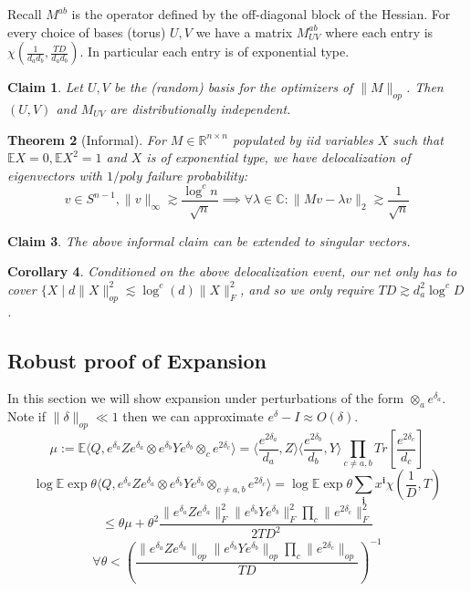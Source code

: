 \documentclass{article}
\newtheorem{theorem}{Theorem}
\newtheorem{corollary}[theorem]{Corollary}
\newtheorem{claim}[theorem]{Claim}
\newcommand{\R}{{\mathbb{R}}}
\newcommand{\C}{{\mathbb{C}}}
\renewcommand{\vec}{\bm}
\newcommand{\E}{\mathbb{E}}
\begin{document}
Recall $M^{ab}$ is the operator defined by the off-diagonal block of the Hessian. For every choice of bases (torus) $U,V$ we have a matrix $M^{ab}_{UV}$ where each entry is $\chi(\frac{1}{d_{a}d_{b}}, \frac{TD}{d_{a}d_{b}})$. In particular each entry is of exponential type.

\begin{claim}
Let $U,V$ be the (random) basis for the optimizers of $\|M\|_{op}$. Then $(U,V)$ and $M_{UV}$ are distributionally independent.
\end{claim}

\begin{theorem} [Informal]
For $M \in \R^{n \times n}$ populated by iid variables $X$ such that $\E X = 0, \E X^{2} = 1$ and $X$ is of exponential type, we have delocalization of eigenvectors with $1/poly$ failure probability:
\[ v \in S^{n-1}, \|v\|_{\infty} \gtrsim \frac{\log^{c} n}{\sqrt{n}} \implies \forall \lambda \in \C: \|Mv - \lambda v\|_{2} \gtrsim \frac{1}{\sqrt{n}}   \]
\end{theorem}


\begin{claim}
The above informal claim can be extended to singular vectors.
\end{claim}

\begin{corollary}
Conditioned on the above delocalization event, our net only has to cover $\{X \mid d \|X\|_{op}^{2} \lesssim \log^{c}(d) \|X\|_{F}^{2}$, and so we only require $TD \gtrsim d_{a}^{2} \log^{c} D$.
\end{corollary}


\subsection{Robust proof of Expansion}
In this section we will show expansion under perturbations of the form $\otimes_{a} e^{\delta_{a}}$. Note if $\|\delta\|_{op} \ll 1$ then we can approximate $e^{\delta} - I \approx O(\delta)$.
\[ \mu := \E \langle Q, e^{\delta_{a}} Z e^{\delta_{a}} \otimes e^{\delta_{b}} Y e^{\delta_{b}} \otimes_{c} e^{2\delta_{c}} \rangle = \langle \frac{e^{2\delta_{a}}}{d_{a}} , Z \rangle \langle \frac{e^{2\delta_{b}}}{d_{b}}, Y \rangle \prod_{c \neq a,b} Tr[\frac{e^{2\delta_{c}}}{d_{c}} ]  \]
\[ \log \E \exp \theta \langle Q, e^{\delta_{a}} Z e^{\delta_{a}} \otimes e^{\delta_{b}} Y e^{\delta_{b}} \otimes_{c \neq a,b} e^{2\delta_{c}} \rangle = \log \E \exp \theta \sum_{\vec{i}} x^{\vec{i}} \chi(\frac{1}{D},T)   \]
\[ \leq \theta \mu + \theta^{2} \frac{\|e^{\delta_{a}} Z e^{\delta_{a}}\|_{F}^{2} \|e^{\delta_{b}} Y e^{\delta_{b}}\|_{F}^{2} \prod_{c} \|e^{2\delta_{c}}\|_{F}^{2}}{2 TD^{2}} \]
\[ \forall \theta < \left( \frac{\|e^{\delta_{a}} Z e^{\delta_{a}}\|_{op} \|e^{\delta_{b}} Y e^{\delta_{b}}\|_{op} \prod_{c} \|e^{2\delta_{c}}\|_{op}}{TD} \right)^{-1}    \]
\end{document}
